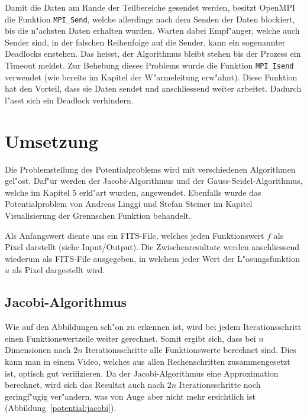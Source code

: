 \begin{refsection}
Damit die Daten am Rande der Teilbereiche gesendet werden,
besitzt OpenMPI die Funktion \texttt{MPI\_Send},
welche allerdings nach dem Senden
der Daten blockiert, bis die n"achsten Daten erhalten wurden. Warten
dabei Empf"anger, welche auch Sender sind, in der falschen Reihenfolge
auf die Sender, kann ein sogenannter Deadlocks enstehen. Das heisst, der
Algorithmus bleibt stehen bis der Prozess ein Timeout meldet. Zur Behebung
dieses Problems wurde die Funktion \texttt{MPI\_Isend} verwendet (wie bereits im
Kapitel der W"armeleitung erw"ahnt). Diese Funktion hat den Vorteil,
dass sie Daten sendet und anschliessend weiter arbeitet. Dadurch l"asst
sich ein Deadlock verhindern. 
		
\section{Umsetzung}
Die Problemstellung des Potentialproblems wird mit verschiedenen
Algorithmen gel"ost. Daf"ur werden der Jacobi-Algorithmus und der
Gauss-Seidel-Algorithmus, welche im Kapitel 5 erkl"art wurden,
angewendet. Ebenfalls wurde das Potentialproblem von Andreas Linggi
und Stefan Steiner im Kapitel Visualisierung der Grennschen Funktion
behandelt.

Als Anfangswert diente uns ein FITS-File, welches jeden
Funktionswert $f$ als Pixel darstellt (siehe Input/Output). Die
Zwischenresultate werden anschliessend wiederum als FITS-File ausgegeben,
in welchem jeder Wert der L"osungsfunktion $u$ als Pixel dargestellt
wird.

\subsection{Jacobi-Algorithmus}
Wie auf den Abbildungen sch"on zu erkennen ist, wird bei jedem
Iterationsschritt einen Funktionswertzeile weiter gerechnet. Somit
ergibt sich, dass bei $n$ Dimensionen nach $2n$ Iterationsschritte alle
Funktionswerte berechnet sind. Dies kann man in einem Video, welches aus
allen Rechenschritten zusammengesetzt ist, optisch gut verifizieren. Da
der Jacobi-Algorithmus eine Approximation berechnet, wird sich das
Resultat auch nach $2n$ Iterationsschritte noch geringf"ugig ver"andern,
was von Auge aber nicht mehr ersichtlich ist
(Abbildung~\ref{potential:jacobi}). 


\end{refsection}

